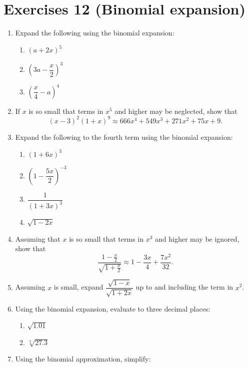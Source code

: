 \documentclass[
  12pt,
  oneside]{book}
\providecommand{\tightlist}{%
  \setlength{\itemsep}{0pt}\setlength{\parskip}{0pt}}
\theoremstyle{definition}
\theoremstyle{definition}
\theoremstyle{definition}
\theoremstyle{definition}
\theoremstyle{remark}
\begin{document}
\chapter*{Exercises 12 (Binomial expansion)}\label{exercises-12-binomial-expansion}

\begin{enumerate}
\def\labelenumi{\arabic{enumi}.}
\item
  Expand the following using the binomial expansion:

  \begin{enumerate}
  \def\labelenumii{\roman{enumii})}
  \tightlist
  \item
    \((a+2x)^5\)
  \item
    \(\left(3a-\dfrac{x}{2}\right)^3\)
  \item
    \(\left(\dfrac{x}{4}-a\right)^4\)
  \end{enumerate}
\item
  If \(x\) is so small that terms in \(x^5\) and higher may be neglected, show that
  \[(x - 3)^2(1 + x)^9 \approx 666x^4 + 549x^3 + 271x^2 + 75x + 9.\]
\item
  Expand the following to the fourth term using the binomial expansion:

  \begin{enumerate}
  \def\labelenumii{\roman{enumii})}
  \tightlist
  \item
    \((1+6x)^3\)
  \item
    \(\left(1-\dfrac{5x}{2}\right)^{-3}\)
  \item
    \(\dfrac{1}{(1+3x)^3}\)
  \item
    \(\sqrt{1-2x}\)
  \end{enumerate}
\item
  Assuming that \(x\) is so small that terms in \(x^3\) and higher may be ignored, show that
  \[\frac{1-\frac{x}{2}}{\sqrt{1+\frac{x}{2}}}\approx 1-\frac{3x}{4}+\frac{7x^2}{32}.\]
\item
  Assuming \(x\) is small, expand \(\dfrac{\sqrt{1-x}}{\sqrt{1+2x}}\) up to and including the term in \(x^2\).
\item
  Using the binomial expansion, evaluate to three decimal places:

  \begin{enumerate}
  \def\labelenumii{\roman{enumii})}
  \tightlist
  \item
    \(\sqrt{1.01}\)
  \item
    \(\sqrt[3]{27.3}\)
  \end{enumerate}
\item
  Using the binomial approximation, simplify:


\end{enumerate}
\end{document}
